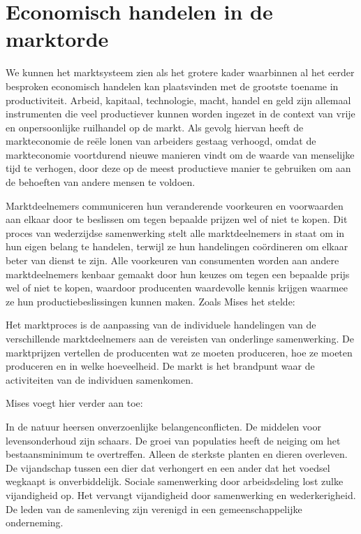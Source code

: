 \hypertarget{economisch-handelen-in-de-marktorde}{%
\section{Economisch handelen in de marktorde}\label{economisch-handelen-in-de-marktorde}}

We kunnen het marktsysteem zien als het grotere kader waarbinnen al het eerder besproken economisch handelen kan plaatsvinden met de grootste toename in productiviteit. Arbeid, kapitaal, technologie, macht, handel en geld zijn allemaal instrumenten die veel productiever kunnen worden ingezet in de context van vrije en onpersoonlijke ruilhandel op de markt. Als gevolg hiervan heeft de markteconomie de reële lonen van arbeiders gestaag verhoogd, omdat de markteconomie voortdurend nieuwe manieren vindt om de waarde van menselijke tijd te verhogen, door deze op de meest productieve manier te gebruiken om aan de behoeften van andere mensen te voldoen.

Marktdeelnemers communiceren hun veranderende voorkeuren en voorwaarden aan elkaar door te beslissen om tegen bepaalde prijzen wel of niet te kopen. Dit proces van wederzijdse samenwerking stelt alle marktdeelnemers in staat om in hun eigen belang te handelen, terwijl ze hun handelingen coördineren om elkaar beter van dienst te zijn. Alle voorkeuren van consumenten worden aan andere marktdeelnemers kenbaar gemaakt door hun keuzes om tegen een bepaalde prijs wel of niet te kopen, waardoor producenten waardevolle kennis krijgen waarmee ze hun productiebeslissingen kunnen maken. Zoals Mises het stelde:

\begin{blockquotebox}
    Het marktproces is de aanpassing van de individuele handelingen van de verschillende marktdeelnemers aan de vereisten van onderlinge samenwerking. De marktprijzen vertellen de producenten wat ze moeten produceren, hoe ze moeten produceren en in welke hoeveelheid. De markt is het brandpunt waar de activiteiten van de individuen samenkomen.\footnotemark    
\end{blockquotebox}

Mises voegt hier verder aan toe:

\begin{blockquotebox}
    In de natuur heersen onverzoenlijke belangenconflicten. De middelen voor levensonderhoud zijn schaars. De groei van populaties heeft de neiging om het bestaansminimum te overtreffen. Alleen de sterkste planten en dieren overleven. De vijandschap tussen een dier dat verhongert en een ander dat het voedsel wegkaapt is onverbiddelijk. Sociale samenwerking door arbeidsdeling lost zulke vijandigheid op. Het vervangt vijandigheid door samenwerking en wederkerigheid. De leden van de samenleving zijn verenigd in een gemeenschappelijke onderneming.\footnotemark    
\end{blockquotebox}

